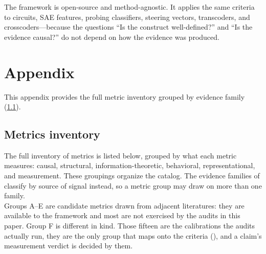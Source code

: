 \documentclass{article}
\begin{document}
The framework is open-source and method-agnostic. It applies the same criteria to circuits, SAE features, probing classifiers, steering vectors, transcoders, and crosscoders---because the questions ``Is the construct well-defined?'' and ``Is the evidence causal?'' do not depend on how the evidence was produced.

%
%



\nocite{campbell1963experimental,loevinger1957objective}



\clearpage
\appendix
\section{Appendix}

This appendix provides the full metric inventory grouped by evidence family (\ref{appendix:metrics}).

\subsection{Metrics inventory}
\label{appendix:metrics}
The full inventory of metrics is listed below, grouped by what each metric measures: causal, structural, information-theoretic, behavioral, representational, and measurement. These groupings organize the catalog. The evidence families of  classify by source of signal instead, so a metric group may draw on more than one family. \\
Groups A--E are candidate metrics drawn from adjacent literatures: they are available to the framework and most are not exercised by the audits in this paper.  Group F is different in kind.  Those fifteen are the calibrations the audits actually run, they are the only group that maps onto the criteria (), and a claim's measurement verdict is decided by them.
\\
\begingroup
\small
\setlength{\tabcolsep}{4pt}
\renewcommand{\arraystretch}{1.15}
\end{document}
